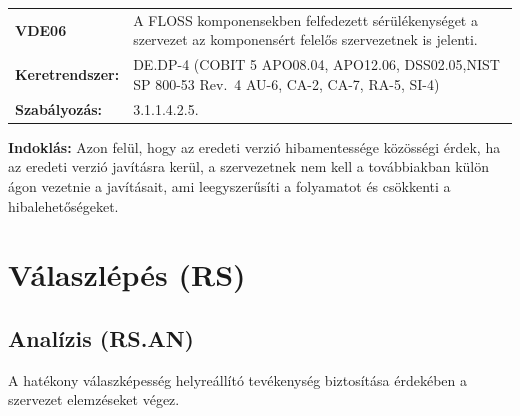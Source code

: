 \documentclass[12pt,magyar,a4paper,oneside]{scrreprt}
\begin{document}
\begin{longtable}[]{@{}ll@{}}
\toprule
\endhead
\begin{minipage}[t]{0.16\columnwidth}\raggedright
\textbf{VDE06}\strut
\end{minipage} & \begin{minipage}[t]{0.79\columnwidth}\raggedright
A FLOSS komponensekben felfedezett sérülékenységet a szervezet az
komponensért felelős szervezetnek is jelenti.\strut
\end{minipage}\tabularnewline
\begin{minipage}[t]{0.16\columnwidth}\raggedright
\textbf{Keretrendszer:}\strut
\end{minipage} & \begin{minipage}[t]{0.79\columnwidth}\raggedright
DE.DP-4 (COBIT 5 APO08.04, APO12.06, DSS02.05,NIST SP 800-53 Rev.~4
AU-6, CA-2, CA-7, RA-5, SI-4)\strut
\end{minipage}\tabularnewline
\begin{minipage}[t]{0.16\columnwidth}\raggedright
\textbf{Szabályozás:}\strut
\end{minipage} & \begin{minipage}[t]{0.79\columnwidth}\raggedright
3.1.1.4.2.5.\strut
\end{minipage}\tabularnewline
\bottomrule
\end{longtable}

\textbf{Indoklás: } Azon felül, hogy az eredeti verzió hibamentessége
közösségi érdek, ha az eredeti verzió javításra kerül, a szervezetnek
nem kell a továbbiakban külön ágon vezetnie a javításait, ami
leegyszerűsíti a folyamatot és csökkenti a hibalehetőségeket.

\hypertarget{vuxe1laszluxe9puxe9s-rs}{%
\section{Válaszlépés (RS)}\label{vuxe1laszluxe9puxe9s-rs}}

\hypertarget{analuxedzis-rs.an}{%
\subsection{Analízis (RS.AN)}\label{analuxedzis-rs.an}}

A hatékony válaszképesség helyreállító tevékenység biztosítása érdekében
a szervezet elemzéseket végez.
\end{document}
